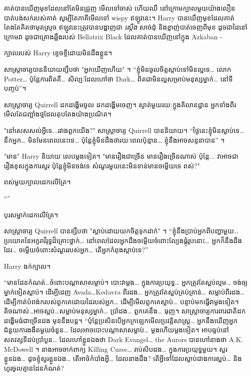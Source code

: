 {គាត់បានឃើញមុខដែលនៅតែមិនជ្រួញ មើលទៅចាស់ ហើយឈឺ នៅក្រោមក្បាលមួយយ៉ាងលឿនបាត់បង់សក់របស់គាត់ សូម្បីតែភាគីមើលទៅ wispy ឥឡូវនេះ។ Harry បានឃើញមុខដែលគាត់តែងតែគិតថាមុតស្រួច ឥឡូវនេះត្រូវបានបង្ហាញជា \emph{ស្តើង} សាច់ដុំ និងខ្លាញ់បាត់ចេញពីមុខ ដូចជាដៃនៅក្រោមវា ដូចជាគ្រោងឆ្អឹងរបស់ Bellatrix Black ដែលគាត់បានឃើញនៅក្នុង Azkaban -

ក្បាលរបស់ Harry ខ្ទេចខ្ទីដោយមិនដឹងខ្លួន។

សាស្រ្តាចារ្យបាននិយាយខ្សឹបថា "អ្នកឃើញហើយ" ។ “ខ្ញុំ​មិន​ចូល​ចិត្ត​ស្តាប់​ទៅ​មិន​ល្អ​ទេ… លោក ~ Potter… ប៉ុន្តែ​ការ​ពិត​គឺ… សិល្បៈ​ដែល​ហៅ​ថា Dark… ពិត​ជា​មិន​ល្អ​សម្រាប់​មនុស្ស​ម្នាក់… នៅ​ទី​បញ្ចប់”។

សាស្ត្រាចារ្យ Quirrell ដកដង្ហើមចូល ដកដង្ហើមចេញ។ ស្ងាត់មួយរយៈក្នុងគិលានដ្ឋាន អ្នកទាំងពីរមើលតែជញ្ជាំងថ្មដែលតុបតែងយ៉ាងប្រណិត។

"នៅសេសសល់អ្វីទេ...រវាងពួកយើង?" សាស្ត្រាចារ្យ Quirrell បាននិយាយ។ “ថ្ងៃនេះខ្ញុំមិនស្លាប់ទេ… នឹកអ្នក… មិនមែនពេលនេះទេ… ប៉ុន្តែខ្ញុំមិនដឹងថារយៈពេលប៉ុន្មាន… ខ្ញុំនឹងអាចសន្ទនាបាន” ។

"មាន" Harry និយាយ លេបម្តងទៀត។ "មានរឿងជាច្រើន មានរឿងច្រើនណាស់ ប៉ុន្តែ... វាអាចជារឿងខុសក្នុងការសួរ ប៉ុន្តែខ្ញុំមិនចង់ទេ សំណួរមួយនេះមិនទាន់មានចម្លើយទេ ពស់?"

ពស់មួយក្បាលដេកលើគ្រែ។

“”

បុរសម្នាក់ដេកលើគ្រែ។

សាស្រ្តាចារ្យ Quirrell បានខ្សឹបថា "ស្តាប់ដោយយកចិត្តទុកដាក់" ។ “ខ្ញុំនឹងប្រាប់អ្នកពីបញ្ហាមួយ… ប្រយោគនៃអក្ខរាវិរុទ្ធដ៏គ្រោះថ្នាក់… នៅពេលដែលអ្នកដឹងចម្លើយចំពោះល្បែងផ្គុំរូបនោះ… អ្នកក៏នឹងដឹងដែរ… ចម្លើយចំពោះសំណួររបស់អ្នក… តើអ្នកកំពុងស្តាប់ទេ?”

Harry ងក់ក្បាល។

“មានដែនកំណត់…ចំពោះបណ្តាសាសម្លាប់។ បោះវាម្តង… ក្នុងការប្រយុទ្ធ… អ្នកត្រូវតែស្អប់ល្មម… ចង់ឲ្យម្នាក់ទៀតស្លាប់។ ដើម្បីដេញ Avada…Kedavra ពីរដង… អ្នកត្រូវតែស្អប់គ្រប់គ្រាន់… សម្លាប់ពីរដង… ដើម្បីកាត់បំពង់ករបស់ពួកគេដោយដៃរបស់អ្នក… ដើម្បីមើលពួកគេស្លាប់… បន្ទាប់មកធ្វើវាម្តងទៀត។ តិចណាស់…អាចស្អប់…សម្លាប់មនុស្សម្នាក់… ប្រាំដង… ពួកគេនឹង… ធុញ។ សាស្ត្រាចារ្យការពារជាតិដកដង្ហើមធំជាច្រើនដង មុននឹងបន្ត។ “ប៉ុន្តែប្រសិនបើអ្នកក្រឡេកមើលប្រវត្តិសាស្រ្ត… អ្នកនឹងឃើញអ្នកជំនួយការងងឹតមួយចំនួន… ដែលអាចបោះបណ្តាសាសម្លាប់… ម្តងហើយម្តងទៀត។ អាបធ្មប់នៅសតវត្សទីដប់ប្រាំបួន… ដែលហៅខ្លួនឯងថា Dark Evangel… the Aurors បានហៅនាងថា A.K. McDowell ។ នាង​អាច​ចាក់​ពាក្យ Killing Curse… រាប់សិប​ដង… ក្នុង​ការ​ប្រយុទ្ធ​មួយ។ សួរខ្លួនឯង… ដូចខ្ញុំសួរខ្លួនឯង… តើអាថ៌កំបាំងអ្វី… ដែលនាងដឹង? តើ​អ្វី​ទៅ​ដែល​ស្លាប់​ជាង​ការ​ស្អប់… និង​ហូរ​ចូល​គ្មាន​ដែន​កំណត់?

}
